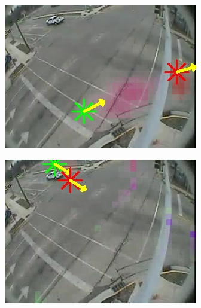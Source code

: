 \begin{figure}
\begin{subfigure}{0.32\linewidth}
            \includegraphics[width=\linewidth]{./img/scene_learning/res/intersection_4/intersection_4-4.jpg}
        \end{subfigure}
        \begin{subfigure}{0.32\linewidth}
            \includegraphics[width=\linewidth]{./img/scene_learning/res/intersection_4/intersection_4-5.jpg}
        \end{subfigure}
        \begin{subfigure}{0.32\linewidth}

\end{subfigure}
\end{figure}
